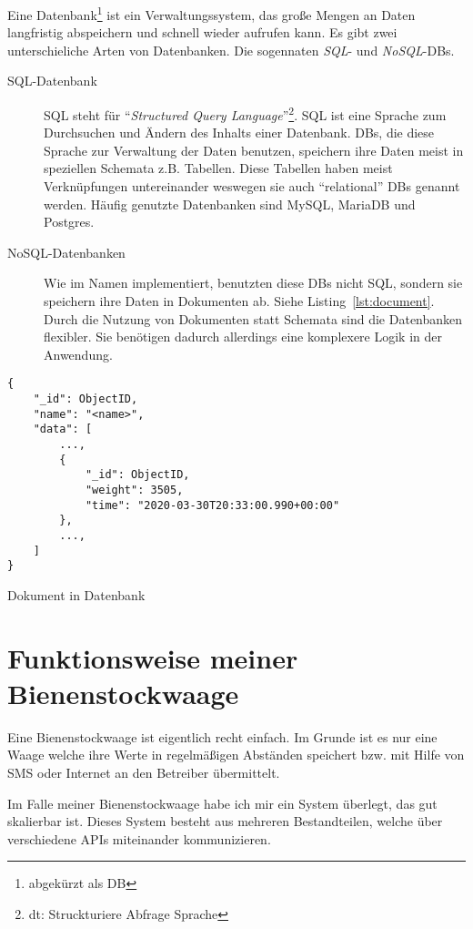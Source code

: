 \documentclass[a4paper, ngerman, 11pt]{scrartcl}
\begin{document}
Eine Datenbank\footnote{abgekürzt als DB} ist ein Verwaltungssystem, das große Mengen an Daten langfristig abspeichern und schnell wieder aufrufen kann.
Es gibt zwei unterschieliche Arten von Datenbanken. Die sogennaten \emph{SQL}- und \emph{NoSQL}-DBs.

\begin{description}
	\item[SQL-Datenbank] SQL steht für \enquote{\emph{Structured Query Language}}\footnote{dt: Struckturiere Abfrage Sprache}.
		SQL ist eine Sprache zum Durchsuchen und Ändern des Inhalts einer Datenbank.
		DBs, die diese Sprache zur Verwaltung der Daten benutzen, speichern ihre Daten meist in speziellen Schemata z.B. Tabellen.
		Diese Tabellen haben meist Verknüpfungen untereinander weswegen sie auch \enquote{relational} DBs genannt werden.
		Häufig genutzte Datenbanken sind MySQL, MariaDB und Postgres.
	\item[NoSQL-Datenbanken]
		Wie im Namen implementiert, benutzten diese DBs nicht SQL, sondern sie speichern ihre Daten in Dokumenten ab. Siehe Listing~\ref{lst:document}.
		Durch die Nutzung von Dokumenten statt Schemata sind die Datenbanken flexibler.
		Sie benötigen dadurch allerdings eine komplexere Logik in der Anwendung.
\end{description}

\begin{listing}[H]
\begin{verbatim}
{
    "_id": ObjectID,
    "name": "<name>",
    "data": [
        ...,
        {
            "_id": ObjectID,
            "weight": 3505,
            "time": "2020-03-30T20:33:00.990+00:00"
        },
        ...,
    ]
}
\end{verbatim}
\caption{Dokument in Datenbank\label{lst:document}}
\end{listing}
\section{Funktionsweise meiner Bienenstockwaage}\label{sec:function}

Eine Bienenstockwaage ist eigentlich recht einfach.
Im Grunde ist es nur eine Waage welche ihre Werte in regelmäßigen Abständen speichert bzw.
mit Hilfe von SMS oder Internet an den Betreiber übermittelt.

Im Falle meiner Bienenstockwaage habe ich mir ein System überlegt, das gut skalierbar ist.
Dieses System besteht aus mehreren Bestandteilen, welche über verschiedene APIs miteinander kommunizieren.
\end{document}
